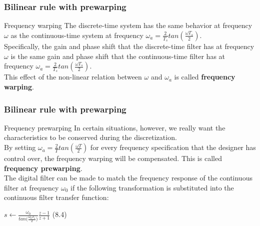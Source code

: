 \begin{frame}
	\frametitle{Bilinear rule with prewarping}
	\begin{block}{Frequency warping}
		The discrete-time system has the same behavior at frequency $\omega$ as the continuous-time system at frequency $\omega_a = \frac{2}{T_s} tan(\frac{\omega T_s}{2})$. \\ 
		\vspace{1em}
		Specifically, the gain and phase shift that the discrete-time filter has at frequency $\omega$ is the same gain and phase shift that the continuous-time filter has at frequency  $\omega_a = \frac{2}{T_s} tan(\frac{\omega T_s}{2})$.\\
		\vspace{1em}
		This effect of the non-linear relation between $\omega$ and $\omega_a$ is called \textbf{frequency warping}.
	\end{block}
\end{frame}

\begin{frame}
	\frametitle{Bilinear rule with prewarping}
	\begin{block}{Frequency prewarping}
		In certain situations, however, we really want the characteristics to be conserved during the discretization.\\
		\vspace{1em}
		By setting $\omega_a = \frac{2}{T} tan(\frac{\omega T}{2})$ for every frequency specification that the designer has control over, the frequency warping will be compensated. This is called \textbf{frequency prewarping}.\\
		\vspace{1em}
		The digital filter can be made to match the frequency response of the continuous filter at frequency  $\omega_0$  if the following transformation is substituted into the continuous filter transfer function:
		\begin{center}
			$s \gets \frac{\omega_0}{tan\big(\frac{\omega_0T_s}{2}\big)} \frac{z-1}{z+1}$ (8.4)
		\end{center}
	\end{block}
\end{frame}

